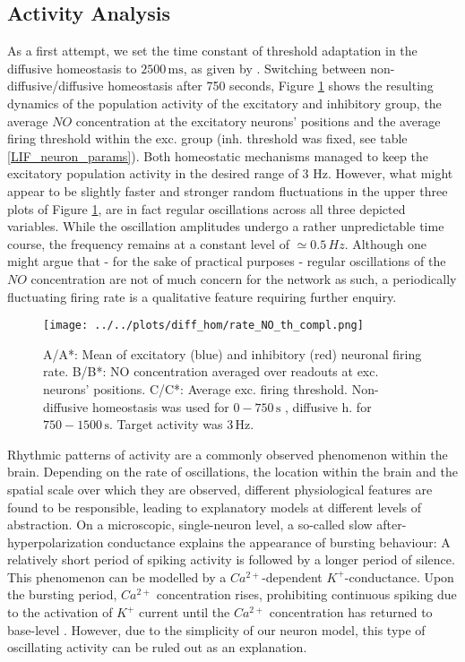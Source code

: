 \documentclass[10pt,a4paper]{article}
\begin{document}
\subsection{Activity Analysis} \label{activ_analys}
As a first attempt, we set the time constant of threshold adaptation in the diffusive homeostasis to $\mathrm{2500\, ms}$, as given by \cite{Sweeney_Paper}. Switching between non-diffusive/diffusive homeostasis after 750 seconds, Figure \ref{full_sim_osci} shows the resulting dynamics of the population activity of the excitatory and inhibitory group, the average $NO$ concentration at the excitatory neurons' positions and the average firing threshold within the exc. group (inh. threshold was fixed, see table \ref{LIF_neuron_params}). Both homeostatic mechanisms managed to keep the excitatory population activity in the desired range of 3 Hz. However, what might appear to be slightly faster and stronger random fluctuations in the upper three plots of Figure \ref{full_sim_osci}, are in fact regular oscillations across all three depicted variables. While the oscillation amplitudes undergo a rather unpredictable time course, the frequency remains at a constant level of $\simeq 0.5\, Hz$. Although one might argue that - for the sake of practical purposes - regular oscillations of the $NO$ concentration are not of much concern for the network as such, a periodically fluctuating firing rate is a qualitative feature requiring further enquiry.
\begin{figure}
\texttt{[image: ../../plots/diff\_hom/rate\_NO\_th\_compl.png]}
\caption{A/A*: Mean of excitatory (blue) and inhibitory (red) neuronal firing rate. B/B*: NO concentration averaged over readouts at exc. neurons' positions. C/C*: Average exc. firing threshold. Non-diffusive homeostasis was used for $\mathrm{0-750\, s}$ , diffusive h. for $\mathrm{750-1500\, s}$. Target activity was $\mathrm{3\, Hz}$.}
\label{full_sim_osci}
\end{figure}

Rhythmic patterns of activity are a commonly observed phenomenon within the brain. Depending on the rate of oscillations, the location within the brain and the spatial scale over which they are observed, different physiological features are found to be responsible, leading to explanatory models at different levels of abstraction. On a microscopic, single-neuron level, a so-called slow after-hyperpolarization conductance explains the appearance of bursting behaviour: A relatively short period of spiking activity is followed by a longer period of silence. This phenomenon can be modelled by a $Ca^{2+}$-dependent $K^{+}$-conductance. Upon the bursting period, $Ca^{2+}$ concentration rises, prohibiting continuous spiking due to the activation of $K^{+}$  current until the $Ca^{2+}$ concentration has returned to base-level \cite[p.~203-207]{Theor_Neur_Dayan}. However, due to the simplicity of our neuron model, this type of oscillating activity can be ruled out as an explanation.
\end{document}
